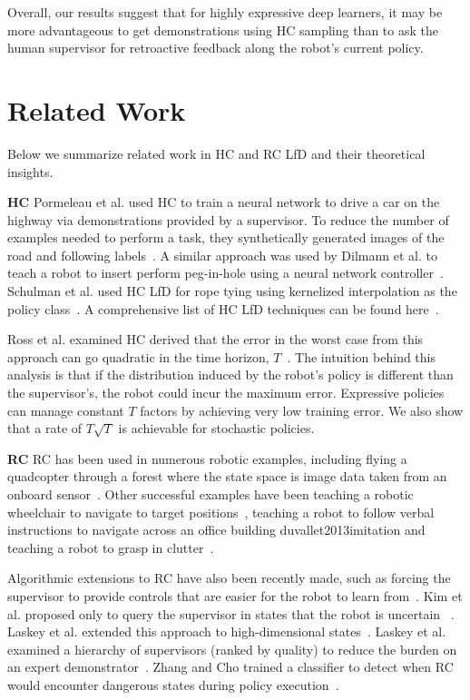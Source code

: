 \documentclass[10pt, conference]{ieeeconf}      %
\newcommand{\ns}{HC }
\newcommand{\nc}{RC }
\begin{document}
Overall, our results suggest that for highly expressive deep learners, it may be more advantageous to get demonstrations using HC sampling than to ask the human supervisor for retroactive feedback along the robot's current policy.


\section{Related Work}
Below we summarize related work in HC and RC LfD and their theoretical insights. 

\noindent \textbf {\ns}  Pormeleau et al. used \ns to train a neural network to drive a car on the highway via demonstrations provided by a supervisor. To reduce the number of examples needed to perform a task, they synthetically generated images of the road and following labels~\cite{pomerleau1989alvinn}.  A similar approach was used by Dilmann et al. to teach a robot to insert perform peg-in-hole using a neural network controller~\cite{dillmann1995acquisition}. Schulman et al. used HC LfD for rope tying using kernelized interpolation as the policy class~\cite{schulman2016learning}.  A comprehensive list of HC LfD techniques can be found here~\cite{argall2009survey}. 

Ross et al. examined \ns  derived that the error in the worst case from this approach can go quadratic in the time horizon, $T$~\cite{ross2010efficient}. The intuition behind this analysis is that if the distribution induced by the robot's policy is different than the supervisor's, the robot could incur the maximum error. Expressive policies can manage constant $T$ factors by achieving very low training error. We also show that a rate of $T\sqrt{T}$ is achievable for stochastic policies. 

\noindent \textbf{\nc}
\nc has been used in numerous robotic examples, including flying a quadcopter through a forest where the state space is image data taken from an onboard sensor~\cite{ross2013learning}. Other successful examples have been teaching a robotic wheelchair to navigate to target positions~\cite{kim2013maximum}, teaching a robot to follow verbal instructions to navigate across an office building {duvallet2013imitation} and teaching a robot to grasp in clutter~\cite{laskeyrobot}.

Algorithmic extensions to \nc have also been recently made, such as forcing the supervisor to provide controls that are easier for the robot to learn from~\cite{he2012imitation}.  Kim et al. proposed only to query the supervisor in states that the robot is uncertain~\cite{kim2013maximum} . Laskey et al. extended this approach to high-dimensional states~\cite{laskeyshiv}. Laskey et al. examined a hierarchy of supervisors (ranked by quality)  to reduce the burden on an expert demonstrator~\cite{laskeyrobot}. Zhang and Cho trained a classifier to detect when \nc would encounter dangerous states during policy execution~\cite{zhang2016query}.
\end{document}
